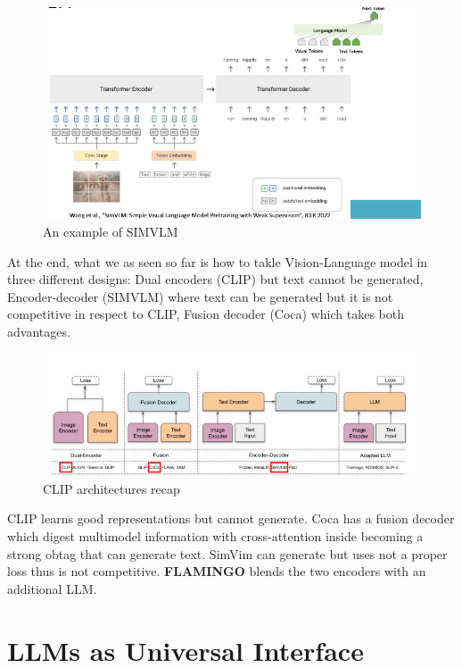 \begin{figure}[H]
    \centering
    \includegraphics[width=1\linewidth]{tikz/SIMVLM.png}
    \caption{An example of SIMVLM}
    \label{fig:SIMVLM}
\end{figure}

At the end, what we as seen so far is how to takle Vision-Language model in three different designs: Dual encoders (CLIP) but text cannot be generated, Encoder-decoder (SIMVLM) where text can be generated but it is not competitive in respect to CLIP, Fusion decoder (Coca) which takes both advantages.


\begin{figure}[H]
    \centering
    \includegraphics[width=1\linewidth]{tikz/CLIP Recap.png}
    \caption{CLIP architectures recap}
    \label{fig:CLIP-recap}
\end{figure}

CLIP learns good representations but cannot generate. Coca has a fusion decoder which digest multimodel information with cross-attention inside becoming a strong obtag that can generate text. SimVim can generate but uses not a proper loss thus is not competitive. \textbf{FLAMINGO} blends the two encoders with an additional LLM.

\section{LLMs as Universal Interface}

